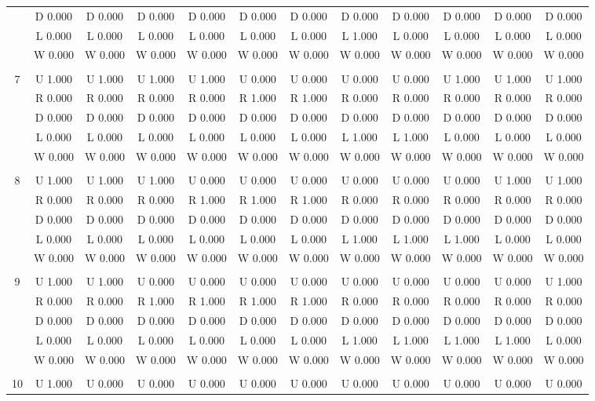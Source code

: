 \begin{table}[htbp]
\begin{tiny}
\begin{tabular}{c|c|c|c|c|c|c|c|c|c|c|c|}
&D 0.000&D 0.000&D 0.000&D 0.000&D 0.000&D 0.000&D 0.000&D 0.000&D 0.000&D 0.000&D 0.000\\
&L 0.000&L 0.000&L 0.000&L 0.000&L 0.000&L 0.000&L 1.000&L 0.000&L 0.000&L 0.000&L 0.000\\
&W 0.000&W 0.000&W 0.000&W 0.000&W 0.000&W 0.000&W 0.000&W 0.000&W 0.000&W 0.000&W 0.000\\
\hline \\
7&U 1.000&U 1.000&U 1.000&U 1.000&U 0.000&U 0.000&U 0.000&U 0.000&U 1.000&U 1.000&U 1.000\\
&R 0.000&R 0.000&R 0.000&R 0.000&R 1.000&R 1.000&R 0.000&R 0.000&R 0.000&R 0.000&R 0.000\\
&D 0.000&D 0.000&D 0.000&D 0.000&D 0.000&D 0.000&D 0.000&D 0.000&D 0.000&D 0.000&D 0.000\\
&L 0.000&L 0.000&L 0.000&L 0.000&L 0.000&L 0.000&L 1.000&L 1.000&L 0.000&L 0.000&L 0.000\\
&W 0.000&W 0.000&W 0.000&W 0.000&W 0.000&W 0.000&W 0.000&W 0.000&W 0.000&W 0.000&W 0.000\\
\hline \\
8&U 1.000&U 1.000&U 1.000&U 0.000&U 0.000&U 0.000&U 0.000&U 0.000&U 0.000&U 1.000&U 1.000\\
&R 0.000&R 0.000&R 0.000&R 1.000&R 1.000&R 1.000&R 0.000&R 0.000&R 0.000&R 0.000&R 0.000\\
&D 0.000&D 0.000&D 0.000&D 0.000&D 0.000&D 0.000&D 0.000&D 0.000&D 0.000&D 0.000&D 0.000\\
&L 0.000&L 0.000&L 0.000&L 0.000&L 0.000&L 0.000&L 1.000&L 1.000&L 1.000&L 0.000&L 0.000\\
&W 0.000&W 0.000&W 0.000&W 0.000&W 0.000&W 0.000&W 0.000&W 0.000&W 0.000&W 0.000&W 0.000\\
\hline \\
9&U 1.000&U 1.000&U 0.000&U 0.000&U 0.000&U 0.000&U 0.000&U 0.000&U 0.000&U 0.000&U 1.000\\
&R 0.000&R 0.000&R 1.000&R 1.000&R 1.000&R 1.000&R 0.000&R 0.000&R 0.000&R 0.000&R 0.000\\
&D 0.000&D 0.000&D 0.000&D 0.000&D 0.000&D 0.000&D 0.000&D 0.000&D 0.000&D 0.000&D 0.000\\
&L 0.000&L 0.000&L 0.000&L 0.000&L 0.000&L 0.000&L 1.000&L 1.000&L 1.000&L 1.000&L 0.000\\
&W 0.000&W 0.000&W 0.000&W 0.000&W 0.000&W 0.000&W 0.000&W 0.000&W 0.000&W 0.000&W 0.000\\
\hline \\
10&U 1.000&U 0.000&U 0.000&U 0.000&U 0.000&U 0.000&U 0.000&U 0.000&U 0.000&U 0.000&U 0.000\\

\end{tabular}
\end{tiny}
\end{table}
